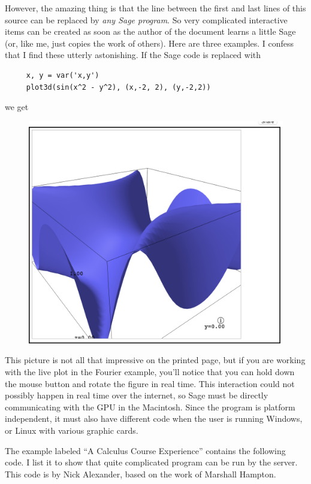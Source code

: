 \documentclass[11pt, oneside]{article}   	%
\begin{document}
However, the amazing thing is that the line between the first and last lines of this source can be replaced by {\em any Sage program}. So very complicated interactive items can be created as soon as the author of the document learns a little Sage (or, like me, just copies the work of others).
Here are three examples. I confess that I find these utterly astonishing.
If the Sage code is replaced with
\begin{verbatim}
     x, y = var('x,y')
     plot3d(sin(x^2 - y^2), (x,-2, 2), (y,-2,2))
\end{verbatim}
we get
\begin{figure}[htbp] %
     \includegraphics[width=4in.]{Graphics/shot9.png} %
\end{figure}

This picture is not all that impressive on the printed page, but if you are working with the live plot in the Fourier example, you'll notice that you can hold down the mouse button and rotate the figure in real time. This interaction could not possibly happen in real time over the internet, so Sage must be directly communicating with the GPU in the Macintosh. Since the program is platform independent, it must also have different code when the user is running Windows, or Linux with various graphic cards.

The example labeled ``A Calculus Course Experience'' contains the following code. I list it to show that quite complicated program can be run by the server. This code is by Nick Alexander, based on the work of Marshall Hampton.
\end{document}
